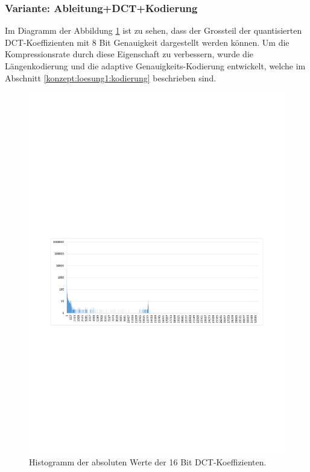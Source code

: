 \subsubsection{Variante: Ableitung+DCT+Kodierung} \label{resultate:loesung1:ableitung_dct_kodierung}
Im Diagramm der Abbildung \ref{resultate:loesung1:dct:histogramm} ist zu sehen, dass der Grossteil der quantisierten DCT-Koeffizienten mit 8 Bit Genauigkeit dargestellt werden können. Um die Kompressionsrate durch diese Eigenschaft zu verbessern, wurde die Längenkodierung und die adaptive Genauigkeits-Kodierung entwickelt, welche im Abschnitt \ref{konzept:loesung1:kodierung} beschrieben sind.
\begin{figure}[!htbp]
	\center
	\includegraphics[trim = 1.8cm 11.25cm 1.8cm 12.75cm, clip=true,width=1\textwidth,keepaspectratio]{./pictures/resultate/loesung1/loesung1-6/histo.pdf}
	\caption{Histogramm der absoluten Werte der 16 Bit DCT-Koeffizienten.}
	\label{resultate:loesung1:dct:histogramm}
\end{figure}

